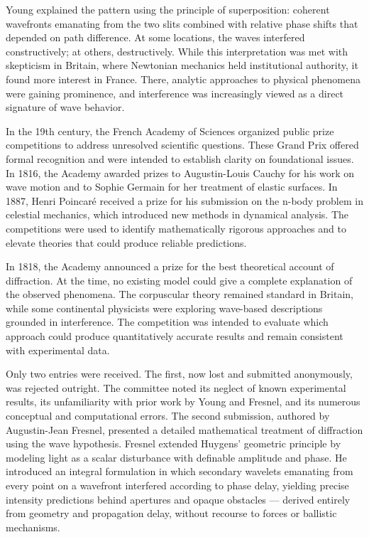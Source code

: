 Young explained the pattern using the principle of superposition: coherent wavefronts emanating from the two slits combined with relative phase shifts that depended on path difference. At some locations, the waves interfered constructively; at others, destructively. While this interpretation was met with skepticism in Britain, where Newtonian mechanics held institutional authority, it found more interest in France. There, analytic approaches to physical phenomena were gaining prominence, and interference was increasingly viewed as a direct signature of wave behavior.

In the 19th century, the French Academy of Sciences organized public prize competitions to address unresolved scientific questions. These Grand Prix offered formal recognition and were intended to establish clarity on foundational issues. In 1816, the Academy awarded prizes to Augustin-Louis Cauchy for his work on wave motion and to Sophie Germain for her treatment of elastic surfaces. In 1887, Henri Poincaré received a prize for his submission on the n-body problem in celestial mechanics, which introduced new methods in dynamical analysis. The competitions were used to identify mathematically rigorous approaches and to elevate theories that could produce reliable predictions.

In 1818, the Academy announced a prize for the best theoretical account of diffraction. At the time, no existing model could give a complete explanation of the observed phenomena. The corpuscular theory remained standard in Britain, while some continental physicists were exploring wave-based descriptions grounded in interference. The competition was intended to evaluate which approach could produce quantitatively accurate results and remain consistent with experimental data.

Only two entries were received. The first, now lost and submitted anonymously, was rejected outright. The committee noted its neglect of known experimental results, its unfamiliarity with prior work by Young and Fresnel, and its numerous conceptual and computational errors. The second submission, authored by Augustin-Jean Fresnel, presented a detailed mathematical treatment of diffraction using the wave hypothesis. Fresnel extended Huygens’ geometric principle by modeling light as a scalar disturbance with definable amplitude and phase. He introduced an integral formulation in which secondary wavelets emanating from every point on a wavefront interfered according to phase delay, yielding precise intensity predictions behind apertures and opaque obstacles — derived entirely from geometry and propagation delay, without recourse to forces or ballistic mechanisms.

